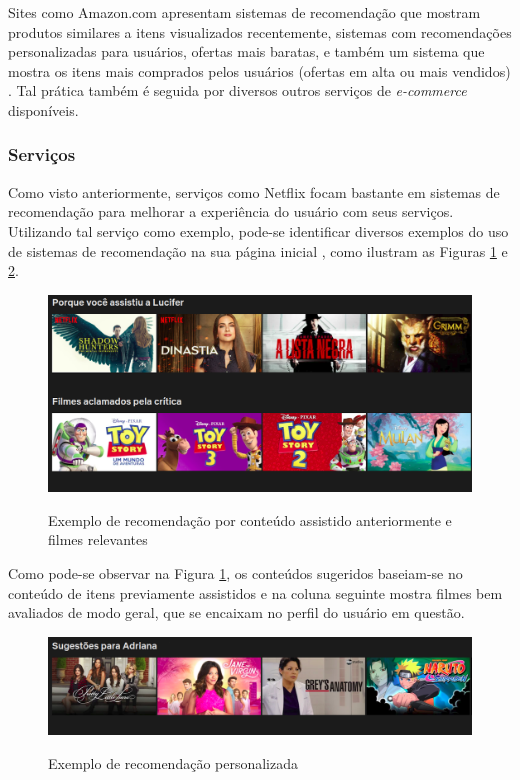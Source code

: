 \documentclass[
	12pt,				%
	oneside,			%
	a4paper,			%
	chapter=TITLE,		%
	english,			%
	french,				%
	spanish,			%
	brazil				%
	]{abntex2}
\begin{document}
Sites como Amazon.com apresentam sistemas de recomendação que mostram produtos similares a itens visualizados recentemente, sistemas com recomendações personalizadas para usuários, ofertas mais baratas, e também um sistema que mostra os itens mais comprados pelos usuários (ofertas em alta ou mais vendidos) \cite{schafer2001commerce}. Tal prática também é seguida por diversos outros serviços de \emph{e-commerce} disponíveis.

\subsubsection{Serviços}

Como visto anteriormente, serviços como Netflix focam bastante em sistemas de recomendação para melhorar a experiência do usuário com seus serviços. Utilizando tal serviço como exemplo, pode-se identificar diversos exemplos do uso de sistemas de recomendação na sua página inicial \cite{gomez2016netflix}, como ilustram as Figuras \ref{fig:netflixconteudo} e \ref{fig:netflix}.

\begin{figure}[H]
    \centering
    \caption{Exemplo de recomendação por conteúdo assistido anteriormente e filmes relevantes}
    \includegraphics[scale=1.5]{images/netflix.png}
    \label{fig:netflixconteudo}
\end{figure}

Como pode-se observar na Figura \ref{fig:netflixconteudo}, os conteúdos sugeridos baseiam-se no conteúdo de itens previamente assistidos e na coluna seguinte mostra filmes bem avaliados de modo geral, que se encaixam no perfil do usuário em questão.

\begin{figure}[H]
    \centering
    \caption{Exemplo de recomendação personalizada}
    \includegraphics[scale=1.5]{images/netflixcontent.png}
    \label{fig:netflix}
\end{figure}
\end{document}
